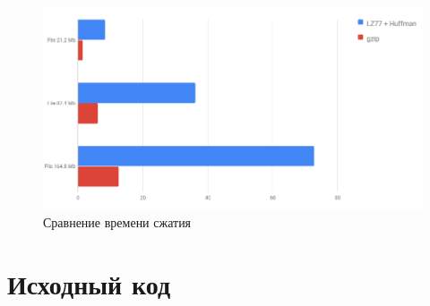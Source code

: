 \documentclass[14pt]{article}
\begin{document}
\pagebreak

\begin{figure}[h]
\centering
\includegraphics[width=1\linewidth]{22.png}
\caption{Сравнение времени сжатия}
\label{fig:mpr}
\end{figure}

\pagebreak

\section*{Исходный код}
\end{document}
